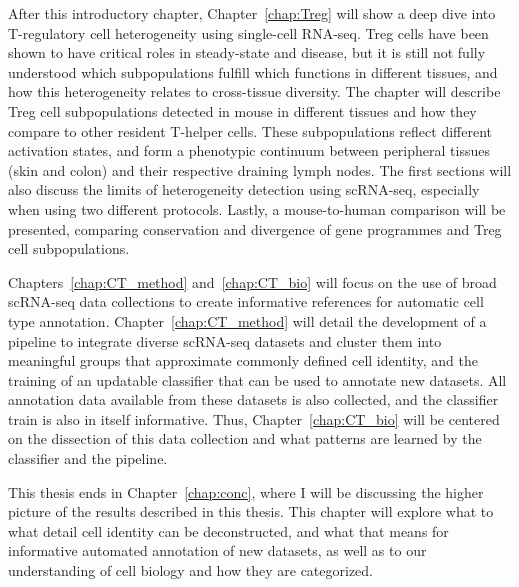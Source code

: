 After this introductory chapter, Chapter~\ref{chap:Treg} will show a deep dive into T-regulatory cell heterogeneity using single-cell RNA-seq. Treg cells have been shown to have critical roles in steady-state and disease, but it is still not fully understood which subpopulations fulfill which functions in different tissues, and how this heterogeneity relates to cross-tissue diversity. The chapter will describe Treg cell subpopulations detected in mouse in different tissues and how they compare to other resident T-helper cells. These subpopulations reflect different activation states, and form a phenotypic continuum between peripheral tissues (skin and colon) and their respective draining lymph nodes. The first sections will also discuss the limits of heterogeneity detection using scRNA-seq, especially when using two different protocols. Lastly, a mouse-to-human comparison will be presented, comparing conservation and divergence of gene programmes and Treg cell subpopulations.

Chapters~\ref{chap:CT_method} and~\ref{chap:CT_bio} will focus on the use of broad scRNA-seq data collections to create informative references for automatic cell type annotation. Chapter~\ref{chap:CT_method} will detail the development of a pipeline to integrate diverse scRNA-seq datasets and cluster them into meaningful groups that approximate commonly defined cell identity, and the training of an updatable classifier that can be used to annotate new datasets. All annotation data available from these datasets is also collected, and the classifier train is also in itself informative. Thus, Chapter~\ref{chap:CT_bio} will be centered on the dissection of this data collection and what patterns are learned by the classifier and the pipeline.

This thesis ends in Chapter~\ref{chap:conc}, where I will be discussing the higher picture of the results described in this thesis. This chapter will explore what to what detail cell identity can be deconstructed, and what that means for informative automated annotation of new datasets, as well as to our understanding of cell biology and how they are categorized. 